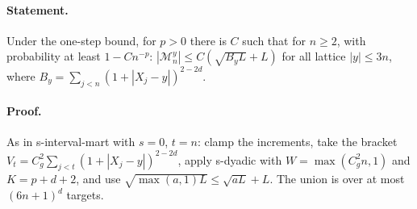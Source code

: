 \paragraph{Statement.} Under the one-step bound, for $p>0$ there is $C$ such that for $n\geq2$, with probability at least $1-Cn^{-p}$: $|\mathcal M^y_n|\leq C(\sqrt{B_yL}+L)$ for all lattice
$|y|\leq3n$, where $B_y=\sum_{j<n}(1+|X_j-y|)^{2-2d}$.
\paragraph{Proof.} As in s-interval-mart with $s=0$, $t=n$: clamp the increments, take the bracket $V_t=C_g^2\sum_{j<t}(1+|X_j-y|)^{2-2d}$, apply s-dyadic with $W=\max(C_g^2n,1)$
and $K=p+d+2$, and use $\sqrt{\max(a,1)L}\leq\sqrt{aL}+L$. The union is over at most $(6n+1)^d$ targets.

